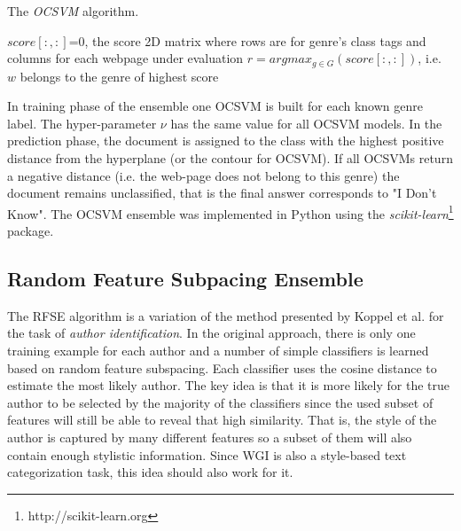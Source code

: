 \hfill \break

\begin{algorithm}[H]
\caption{The \textit{OCSVM} algorithm.}\label{alg:OCSVM-Ensemble}
$score[:, :]$=0, the score 2D matrix where rows are for genre's class tags and columns for each webpage under evaluation
{
        $r = argmax_{g \in G}(score[:, :])$, i.e. $w$ belongs to the genre of highest score\;
    }
\end{algorithm}

\hfill \break


In training phase of the ensemble one OCSVM is built for each known genre label. The hyper-parameter $\nu$ has the same value for all OCSVM models. In the prediction phase, the document is assigned to the class with the highest positive distance from the hyperplane (or the contour for OCSVM). If all OCSVMs return a negative distance (i.e. the web-page does not belong to this genre) the document remains unclassified, that is the final answer corresponds to "I Don't Know". The OCSVM ensemble was implemented in Python using the \textit{scikit-learn}\footnote{http://scikit-learn.org} package.

\subsection{Random Feature Subpacing Ensemble}\label{sec:RFSE_Description}

The RFSE algorithm is a variation of the method presented by Koppel et al.  for the task of \textit{author identification}. In the original approach, there is only one training example for each author and a number of simple classifiers is learned based on random feature subspacing. Each classifier uses the cosine distance to estimate the most likely author. The key idea is that it is more likely for the true author to be selected by the majority of the classifiers since the used subset of features will still be able to reveal that high similarity. That is, the style of the author is captured by many different features so a subset of them will also contain enough stylistic information. Since WGI is also a style-based text categorization task, this idea should also work for it.

